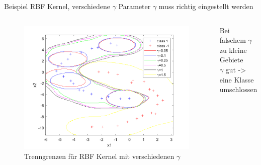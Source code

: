 \documentclass[ngerman]{beamer}
\begin{document}
\begin{frame}{Beispiel RBF Kernel, verschiedene $\gamma$}
    Parameter $\gamma$ muss richtig eingestellt werden \pause
    \begin{columns}
        \begin{column}{0.8\textwidth}
            \begin{figure}
                \includegraphics[width=\textwidth,height=0.7\textheight,keepaspectratio]{../code/octave/images/sgdrbfkernelcomp}
                \caption{Trenngrenzen für RBF Kernel mit verschiedenen $\gamma$}
                \label{fig:bsprbfkernelcomp}
            \end{figure}
        \end{column} \pause
        \begin{column}{0.2\textwidth}
            Bei falschem $\gamma$ zu kleine Gebiete \\ \pause
            \vspace{\baselineskip}
            $\gamma$ gut -> eine Klasse umschlossen
        \end{column}
    \end{columns}
\end{frame}
\end{document}
